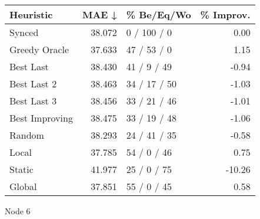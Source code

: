 \begin{tabular}{lrlr}
\toprule
\textbf{Heuristic} & \textbf{MAE ↓} & \textbf{\% Be/Eq/Wo} & \textbf{\% Improv.} \\
\midrule
            Synced &         38.072 &          0 / 100 / 0 &                0.00 \\
     Greedy Oracle &         37.633 &          47 / 53 / 0 &                1.15 \\
         Best Last &         38.430 &          41 / 9 / 49 &               -0.94 \\
       Best Last 2 &         38.463 &         34 / 17 / 50 &               -1.03 \\
       Best Last 3 &         38.456 &         33 / 21 / 46 &               -1.01 \\
    Best Improving &         38.475 &         33 / 19 / 48 &               -1.06 \\
            Random &         38.293 &         24 / 41 / 35 &               -0.58 \\
             Local &         37.785 &          54 / 0 / 46 &                0.75 \\
            Static &         41.977 &          25 / 0 / 75 &              -10.26 \\
            Global &         37.851 &          55 / 0 / 45 &                0.58 \\
\bottomrule
\end{tabular}
\caption{Node 6}
\label{tab:non_lr05_le1_bs4_6}
